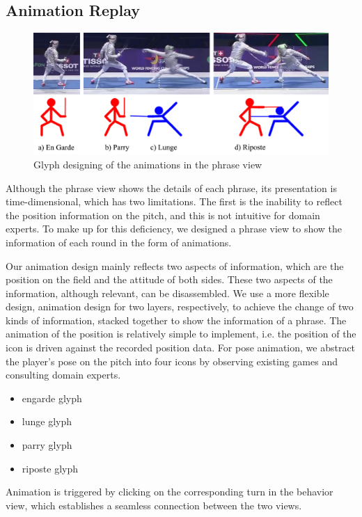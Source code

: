 \documentclass[journal]{vgtc}                %
\begin{document}
\subsection{Animation Replay}
\begin{figure}[tb]
	\centering
	\includegraphics[width=\linewidth]{glyph}
	\caption{Glyph designing of the animations in the phrase view}
	\label{fig:sample}
\end{figure}
Although the phrase view shows the details of each phrase, its presentation is time-dimensional, which has two limitations.
The first is the inability to reflect the position information on the pitch, and this is not intuitive for domain experts.
To make up for this deficiency, we designed a phrase view to show the information of each round in the form of animations.

Our animation design mainly reflects two aspects of information, which are the position on the field and the attitude of both sides.
These two aspects of the information, although relevant, can be disassembled.
We use a more flexible design, animation design for two layers, respectively, to achieve the change of two kinds of information, stacked together to show the information of a phrase.
The animation of the position is relatively simple to implement, i.e. the position of the icon is driven against the recorded position data.
For pose animation, we abstract the player's pose on the pitch into four icons by observing existing games and consulting domain experts.
\begin{itemize}
	\item engarde glyph
	\item lunge glyph
	\item parry glyph
	\item riposte glyph
\end{itemize}
Animation is triggered by clicking on the corresponding turn in the behavior view,  which establishes a seamless connection between the two views.
\end{document}
